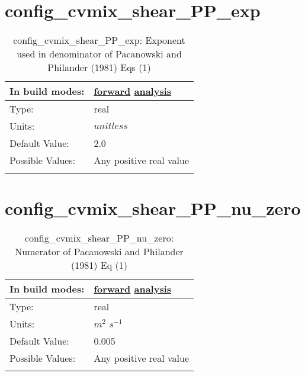 \section[config\_cvmix\_shear\_PP\_exp]{config\_cvmix\_shear\_PP\_exp}
\label{sec:nm_sec_config_cvmix_shear_PP_exp}
\begin{center}
\begin{longtable}{| p{2.0in} || p{4.0in} |}
    \hline
    In build modes: & \hyperref[subsec:forward_nm_tab_cvmix]{forward} \hyperref[subsec:analysis_nm_tab_cvmix]{analysis} \\
    \hline
    Type: & real \\
    \hline
    Units: & $unitless$ \\
    \hline
    Default Value: & 2.0 \\
    \hline
    Possible Values: & Any positive real value \\
    \hline
    \caption{config\_cvmix\_shear\_PP\_exp: Exponent used in denominator of Pacanowski and Philander (1981) Eqs (1)}
\end{longtable}
\end{center}
\section[config\_cvmix\_shear\_PP\_nu\_zero]{config\_cvmix\_shear\_PP\_nu\_zero}
\label{sec:nm_sec_config_cvmix_shear_PP_nu_zero}
\begin{center}
\begin{longtable}{| p{2.0in} || p{4.0in} |}
    \hline
    In build modes: & \hyperref[subsec:forward_nm_tab_cvmix]{forward} \hyperref[subsec:analysis_nm_tab_cvmix]{analysis} \\
    \hline
    Type: & real \\
    \hline
    Units: & $m^2$ $s^{-1}$ \\
    \hline
    Default Value: & 0.005 \\
    \hline
    Possible Values: & Any positive real value \\
    \hline
    \caption{config\_cvmix\_shear\_PP\_nu\_zero: Numerator of Pacanowski and Philander (1981) Eq (1)}
\end{longtable}
\end{center}
